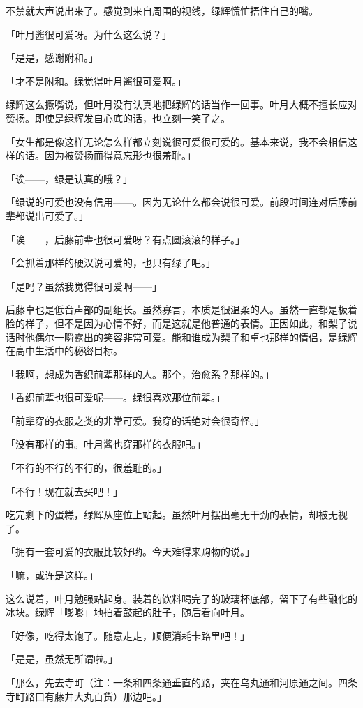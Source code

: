 \documentclass[UTF8]{ctexart}
\begin{document}
    不禁就大声说出来了。感觉到来自周围的视线，绿辉慌忙捂住自己的嘴。

    「叶月酱很可爱呀。为什么这么说？」

    「是是，感谢附和。」

    「才不是附和。绿觉得叶月酱很可爱啊。」

    绿辉这么撅嘴说，但叶月没有认真地把绿辉的话当作一回事。叶月大概不擅长应对赞扬。即使是绿辉发自心底的话，也立刻一笑了之。

    「女生都是像这样无论怎么样都立刻说很可爱很可爱的。基本来说，我不会相信这样的话。因为被赞扬而得意忘形也很羞耻。」

    「诶——，绿是认真的哦？」

    「绿说的可爱也没有信用——。因为无论什么都会说很可爱。前段时间连对后藤前辈都说出可爱了。」

    「诶——，后藤前辈也很可爱呀？有点圆滚滚的样子。」

    「会抓着那样的硬汉说可爱的，也只有绿了吧。」

    「是吗？虽然我觉得很可爱啊——」

    后藤卓也是低音声部的副组长。虽然寡言，本质是很温柔的人。虽然一直都是板着脸的样子，但不是因为心情不好，而是这就是他普通的表情。正因如此，和梨子说话时他偶尔一瞬露出的笑容非常可爱。能和谁成为梨子和卓也那样的情侣，是绿辉在高中生活中的秘密目标。

    「我啊，想成为香织前辈那样的人。那个，治愈系？那样的。」

    「香织前辈也很可爱呢——。绿很喜欢那位前辈。」

    「前辈穿的衣服之类的非常可爱。我穿的话绝对会很奇怪。」

    「没有那样的事。叶月酱也穿那样的衣服吧。」

    「不行的不行的不行的，很羞耻的。」

    「不行！现在就去买吧！」

    吃完剩下的蛋糕，绿辉从座位上站起。虽然叶月摆出毫无干劲的表情，却被无视了。

    「拥有一套可爱的衣服比较好哟。今天难得来购物的说。」

    「嘛，或许是这样。」

    这么说着，叶月勉强站起身。装着的饮料喝完了的玻璃杯底部，留下了有些融化的冰块。绿辉「嘭嘭」地拍着鼓起的肚子，随后看向叶月。

    「好像，吃得太饱了。随意走走，顺便消耗卡路里吧！」

    「是是，虽然无所谓啦。」

    「那么，先去寺町（注：一条和四条通垂直的路，夹在乌丸通和河原通之间。四条寺町路口有藤井大丸百货）那边吧。」
\end{document}

